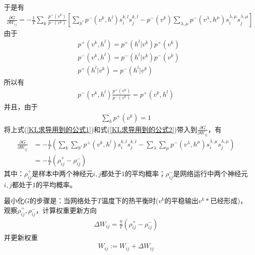 {\begin{align*}
            \end{align*}
            于是有
            \begin{align*}
            \frac{\partial G}{\partial W_{ij}} = -\frac{1}{T} \sum_{k} \frac{p^+(v^k)}{p^-(v^k)}\left[ \sum_{h^l} p^-(v^k,h^l)s_i^{k,l} s_j^{k,l} - p^-(v^k)\sum_{\lambda,\mu}p^-(v^\lambda,h^\mu)s_i^{\lambda,\mu}s_j^{\lambda,\mu} \right]
            \end{align*}
            由于
            \begin{align*}
            & p^+(v^k,h^l) = p^+(h^l|v^k)p^+(v^k)\\
            & p^-(v^k,h^l) = p^-(h^l|v^k)p^-(v^k)\\
            & p^+(h^l|v^k) = p^-(h^l|v^k)
            \end{align*}
            所以有
            \begin{align}
            \label{KL求导用到的公式1}
            p^-(v^k,h^l)\frac{p^+(v^k)}{p^-(v^k)} = p^+(v^k,h^l)
            \end{align}
            并且，由于
            \begin{align}
            \label{KL求导用到的公式2}
            \sum_kp^+(v^k) = 1
            \end{align}
            将上式(\ref{KL求导用到的公式1})和式(\ref{KL求导用到的公式2})带入到$\frac{\partial G}{\partial W_{ij}}$，有
            \begin{align*}
            \frac{\partial G}{\partial W_{ij}} & = -\frac{1}{T}\left( \sum_{k}\sum_{h^l}p^+(v^k,h^l) s_i^{k,l} s_j^{k,l} - \sum_{\lambda}\sum_{\mu}p^-(v^\lambda,h^\mu)s_i^{\lambda,\mu}s_j^{\lambda,\mu}\right) \\
            & =-\frac{1}{T} \left( \rho_{ij}^+ - \rho_{ij}^- \right)
            \end{align*}
            其中：$\rho_{ij}^+$是样本中两个神经元$i,j$都处于$1$的平均概率；$\rho_{ij}^-$是网络运行中两个神经元$i,j$都处于$1$的平均概率。
            \par
            最小化$G$的步骤是：当网络处于$T$温度下的热平衡时($v^k$的平稳输出$v^k*$已经形成)，观察$\rho_{ij}^+,\rho_{ij}^-$，计算权重更新方向
            \begin{align*}
            \Delta W_{ij} = \frac{\eta}{T}(\rho_{ij}^+ - \rho_{ij}^-)
            \end{align*}
            并更新权重
            \begin{align*}
            W_{ij}:= W_{ij} + \Delta W_{ij}
            \end{align*}
}

